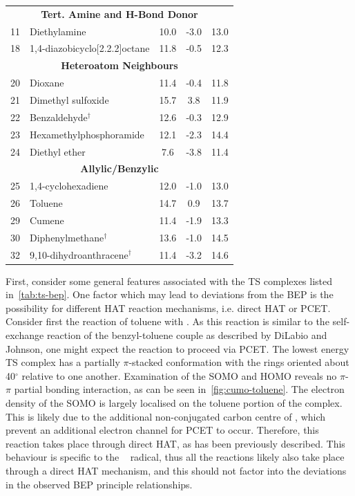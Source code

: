 \begin{table}[!htbp]
\begin{tabular}{l l c c c}
    \multicolumn{5}{c}{\textbf{Tert. Amine and H-Bond Donor}} \\
    11 & Diethylamine & 10.0 & -3.0 & 13.0 \\
    18 & 1,4-diazobicyclo[2.2.2]octane & 11.8 & -0.5 & 12.3 \\
    \hline
    \multicolumn{5}{c}{\textbf{Heteroatom Neighbours}} \\
    20 & Dioxane & 11.4 & -0.4 & 11.8 \\
    21 & Dimethyl sulfoxide & 15.7 & 3.8 & 11.9 \\
    22 & Benzaldehyde$^\dagger$ & 12.6 & -0.3 & 12.9 \\
    23 & Hexamethylphosphoramide & 12.1 & -2.3 & 14.4 \\
    24 & Diethyl ether & 7.6 & -3.8 & 11.4 \\
    \hline
    \multicolumn{5}{c}{\textbf{Allylic/Benzylic}}\\
    25 & 1,4-cyclohexadiene & 12.0 & -1.0 & 13.0 \\
    26 & Toluene & 14.7 & 0.9 & 13.7 \\
    29 & Cumene & 11.4 & -1.9 & 13.3 \\
    30 & Diphenylmethane$^\dagger$ & 13.6 & -1.0 & 14.5 \\
    32 & 9,10-dihydroanthracene$^\dagger$ & 11.4 & -3.2 & 14.6 \\
  \end{tabular}
\end{table}

First, consider some general features associated with the TS complexes listed in~\ref{tab:ts-bep}. One factor which may lead to deviations from the BEP is the possibility for different HAT reaction mechanisms, i.e. direct HAT or PCET. Consider first the reaction of toluene with \cumo. As this reaction is similar to the self-exchange reaction of the benzyl-toluene couple as described by DiLabio and Johnson,\cite{DiLabio2007} one might expect the reaction to proceed via PCET. The lowest energy TS complex has a partially $\pi$-stacked conformation with the rings oriented about 40$^\circ$ relative to one another. Examination of the SOMO and HOMO reveals no $\pi$-$\pi$ partial bonding interaction, as can be seen in~\ref{fig:cumo-toluene}. The electron density of the SOMO is largely localised on the toluene portion of the complex. This is likely due to the additional non-conjugated carbon centre of \cumo, which prevent an additional electron channel for PCET to occur. Therefore, this reaction takes place through direct HAT, as has been previously described.\cite{Salamone2011} This behaviour is specific to the \cumo~ radical, thus all the reactions likely also take place through a direct HAT mechanism, and this should not factor into the deviations in the observed BEP principle relationships.

